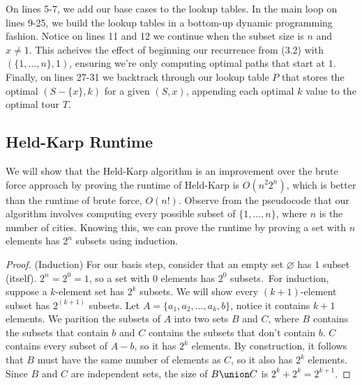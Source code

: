 \documentclass[11pt,fleqn]{article}
\begin{document}
On lines 5-7, we add our base cases to the lookup tables.  In the main loop on
lines 9-25, we build the lookup tables in a bottom-up dynamic programming fashion.
Notice on lines 11 and 12 we continue when the subset size is $n$ and $x \neq 1$.
This acheives the effect of beginning our recurrence from (3.2) with $(\{1,\dots,n\}, 1)$,
ensuring we're only computing optimal paths that start at $1$.  Finally, on lines 27-31
we backtrack through our lookup table $P$ that stores the optimal $(S-\{x\}, k)$
for a given $(S, x)$, appending each optimal $k$ value to the optimal tour $T$.

\subsection{Held-Karp Runtime}
We will show that the Held-Karp algorithm is an improvement over the brute force
approach by proving the runtime of Held-Karp is $O(n^{2}2^n)$, which is better than
the runtime of brute force, $O(n!)$.  Observe from the pseudocode that our algorithm
involves computing every possible subset of $\{1,\dots,n\}$, where $n$ is the number
of cities.  Knowing this, we can prove the runtime by proving a set with $n$ elements
has $2^n$ subsets using induction.

\begin{proof}
  (Induction) For our basis step, consider that an empty set $\varnothing$ has $1$
  subset (itself).  $2^n = 2^0 = 1$, so a set with $0$ elements has $2^0$ subsets.\
  For induction, suppose a $k$-element set has $2^k$ subsets.  We will show every
  $(k+1)$-element subset has $2^(k+1)$ subsets.  Let $A=\{a_1,a_2,\dots,a_k, b\}$,
  notice it contains $k+1$ elements.  We parition the subsets of $A$ into two sets
  $B$ and $C$, where $B$ contains the subsets that contain $b$ and $C$ contains
  the subsets that don't contain $b$.  $C$ contains every subset of $A-{b}$, so it
  has $2^k$ elements.  By construction, it follows that $B$ must have the same number
  of elements as $C$, so it also has $2^k$ elements.  Since $B$ and $C$ are independent
  sets, the size of $B\union C$ is $2^k + 2^k = 2^{k+1}$.
\end{proof}



%
%
%
\newpage


\end{document}
